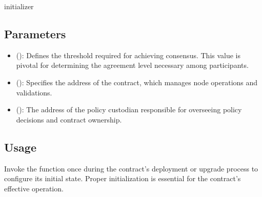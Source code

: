 \documentclass[letterpaper,10pt,english]{sphinxmanual}
\begin{document}
\begin{sphinxVerbatim}[commandchars=\\\{\}]
initializer
\end{sphinxVerbatim}


\subsection{Parameters}
\label{\detokenize{docs_consensus_mechanism_contract:parameters}}\begin{itemize}
\item {} 
\sphinxAtStartPar
{} ():
Defines the threshold required for achieving consensus. This value is pivotal for determining the agreement level necessary among participants.

\item {} 
\sphinxAtStartPar
{} ():
Specifies the address of the  contract, which manages node operations and validations.

\item {} 
\sphinxAtStartPar
{} ():
The address of the policy custodian responsible for overseeing policy decisions and contract ownership.

\end{itemize}


\subsection{Usage}
\label{\detokenize{docs_consensus_mechanism_contract:usage}}
\sphinxAtStartPar
Invoke the  function once during the contract’s deployment or upgrade process to configure its initial state. Proper initialization is essential for the contract’s effective operation.
\end{document}
